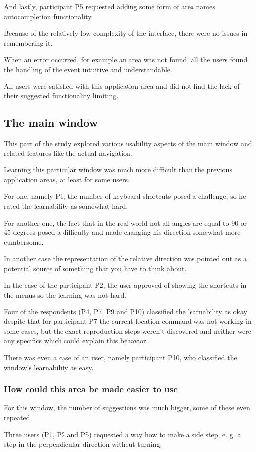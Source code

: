 \documentclass[nolof,digital]{fithesis3}
\begin{document}
And lastly, participant P5 requested adding some form of area names autocompletion functionality.

Because of the relatively low complexity of the interface, there were no issues in remembering it.

When an error occurred, for example an area was not found, all the users found the handling of the event intuitive and understandable.

All users were satisfied with this application area and did not find the lack of their suggested functionality limiting.
\subsection{The main window}
This part of the study explored various usability aspects of the main window and related features like the actual navigation.

Learning this particular window was much more difficult than the previous application areas, at least for some users.

For one, namely P1, the number of keyboard shortcuts posed a challenge, so he rated the learnability as somewhat hard.

For another one, the fact that in the real world not all angles are equal to 90 or 45 degrees posed a difficulty and made changing his direction somewhat more cumbersome.

In another case the representation of the relative direction was pointed out as a potential source of something that you have to think about.

In the case of the participant P2, the user approved of showing the shortcuts in the menus so the learning was not hard.

Four of the respondents (P4, P7, P9 and P10) classified the learnability as okay despite that for participant P7 the current location command was not working in some cases, but the exact reproduction steps weren't discovered and neither were any specifics which could explain this behavior.

There was even a case of an user, namely participant P10, who classified the window's learnability as easy.
\subsubsection{How could this area be made easier to use}
For this window, the number of suggestions was much bigger, some of these even repeated.

Three users (P1, P2 and P5) requested a way how to make a side step, e. g. a step in the perpendicular direction without turning.
\end{document}
